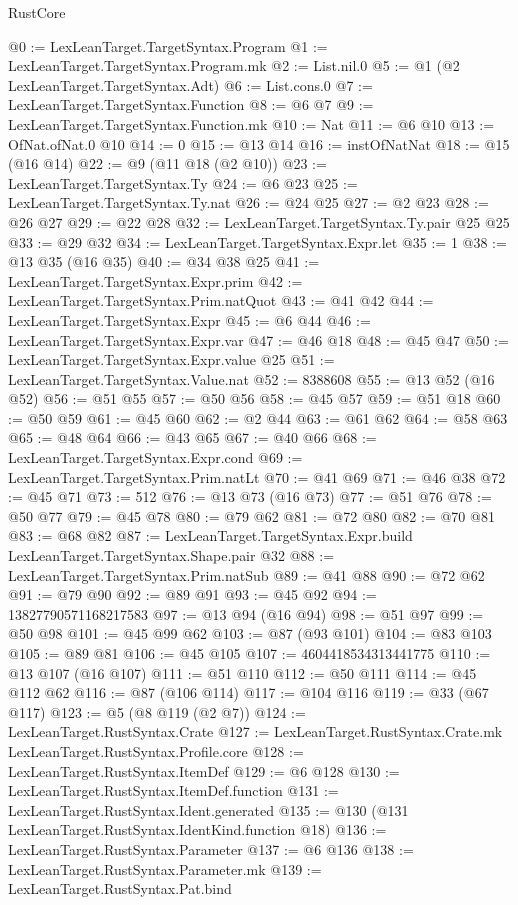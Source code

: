 \begin{lexlean}{RustCore}
\begin{coremodule}
@0 := LexLeanTarget.TargetSyntax.Program
@1 := LexLeanTarget.TargetSyntax.Program.mk
@2 := List.nil.{0}
@5 := @1 (@2 LexLeanTarget.TargetSyntax.Adt)
@6 := List.cons.{0}
@7 := LexLeanTarget.TargetSyntax.Function
@8 := @6 @7
@9 := LexLeanTarget.TargetSyntax.Function.mk
@10 := Nat
@11 := @6 @10
@13 := OfNat.ofNat.{0} @10
@14 := 0
@15 := @13 @14
@16 := instOfNatNat
@18 := @15 (@16 @14)
@22 := @9 (@11 @18 (@2 @10))
@23 := LexLeanTarget.TargetSyntax.Ty
@24 := @6 @23
@25 := LexLeanTarget.TargetSyntax.Ty.nat
@26 := @24 @25
@27 := @2 @23
@28 := @26 @27
@29 := @22 @28
@32 := LexLeanTarget.TargetSyntax.Ty.pair @25 @25
@33 := @29 @32
@34 := LexLeanTarget.TargetSyntax.Expr.let
@35 := 1
@38 := @13 @35 (@16 @35)
@40 := @34 @38 @25
@41 := LexLeanTarget.TargetSyntax.Expr.prim
@42 := LexLeanTarget.TargetSyntax.Prim.natQuot
@43 := @41 @42
@44 := LexLeanTarget.TargetSyntax.Expr
@45 := @6 @44
@46 := LexLeanTarget.TargetSyntax.Expr.var
@47 := @46 @18
@48 := @45 @47
@50 := LexLeanTarget.TargetSyntax.Expr.value @25
@51 := LexLeanTarget.TargetSyntax.Value.nat
@52 := 8388608
@55 := @13 @52 (@16 @52)
@56 := @51 @55
@57 := @50 @56
@58 := @45 @57
@59 := @51 @18
@60 := @50 @59
@61 := @45 @60
@62 := @2 @44
@63 := @61 @62
@64 := @58 @63
@65 := @48 @64
@66 := @43 @65
@67 := @40 @66
@68 := LexLeanTarget.TargetSyntax.Expr.cond
@69 := LexLeanTarget.TargetSyntax.Prim.natLt
@70 := @41 @69
@71 := @46 @38
@72 := @45 @71
@73 := 512
@76 := @13 @73 (@16 @73)
@77 := @51 @76
@78 := @50 @77
@79 := @45 @78
@80 := @79 @62
@81 := @72 @80
@82 := @70 @81
@83 := @68 @82
@87 := LexLeanTarget.TargetSyntax.Expr.build LexLeanTarget.TargetSyntax.Shape.pair @32
@88 := LexLeanTarget.TargetSyntax.Prim.natSub
@89 := @41 @88
@90 := @72 @62
@91 := @79 @90
@92 := @89 @91
@93 := @45 @92
@94 := 13827790571168217583
@97 := @13 @94 (@16 @94)
@98 := @51 @97
@99 := @50 @98
@101 := @45 @99 @62
@103 := @87 (@93 @101)
@104 := @83 @103
@105 := @89 @81
@106 := @45 @105
@107 := 4604418534313441775
@110 := @13 @107 (@16 @107)
@111 := @51 @110
@112 := @50 @111
@114 := @45 @112 @62
@116 := @87 (@106 @114)
@117 := @104 @116
@119 := @33 (@67 @117)
@123 := @5 (@8 @119 (@2 @7))
@124 := LexLeanTarget.RustSyntax.Crate
@127 := LexLeanTarget.RustSyntax.Crate.mk LexLeanTarget.RustSyntax.Profile.core
@128 := LexLeanTarget.RustSyntax.ItemDef
@129 := @6 @128
@130 := LexLeanTarget.RustSyntax.ItemDef.function
@131 := LexLeanTarget.RustSyntax.Ident.generated
@135 := @130 (@131 LexLeanTarget.RustSyntax.IdentKind.function @18)
@136 := LexLeanTarget.RustSyntax.Parameter
@137 := @6 @136
@138 := LexLeanTarget.RustSyntax.Parameter.mk
@139 := LexLeanTarget.RustSyntax.Pat.bind

\end{coremodule}
\end{lexlean}
